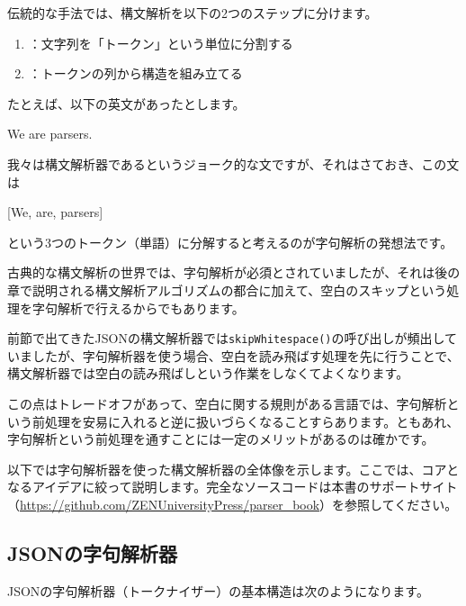 伝統的な手法では、構文解析を以下の2つのステップに分けます。

\begin{enumerate}
\item
  ：文字列を「トークン」という単位に分割する
\item
  ：トークンの列から構造を組み立てる
\end{enumerate}

たとえば、以下の英文があったとします。

\begin{codescreen}{}
We are parsers.
\end{codescreen}

我々は構文解析器であるというジョーク的な文ですが、それはさておき、この文は

\begin{codescreen}{}
[We, are, parsers]
\end{codescreen}

\noindent という3つのトークン（単語）に分解すると考えるのが字句解析の発想法です。

古典的な構文解析の世界では、字句解析が必須とされていましたが、それは後の章で説明される構文解析アルゴリズムの都合に加えて、空白のスキップという処理を字句解析で行えるからでもあります。

前節で出てきたJSONの構文解析器では\texttt{skipWhitespace()}の呼び出しが頻出していましたが、字句解析器を使う場合、空白を読み飛ばす処理を先に行うことで、構文解析器では空白の読み飛ばしという作業をしなくてよくなります。

この点はトレードオフがあって、空白に関する規則がある言語では、字句解析という前処理を安易に入れると逆に扱いづらくなることすらあります。ともあれ、字句解析という前処理を通すことには一定のメリットがあるのは確かです。

以下では字句解析器を使った構文解析器の全体像を示します。ここでは、コアとなるアイデアに絞って説明します。完全なソースコードは本書のサポートサイト（\url{https://github.com/ZENUniversityPress/parser_book}）を参照してください。

\subsection{JSONの字句解析器}

JSONの字句解析器（トークナイザー）の基本構造は次のようになります。

